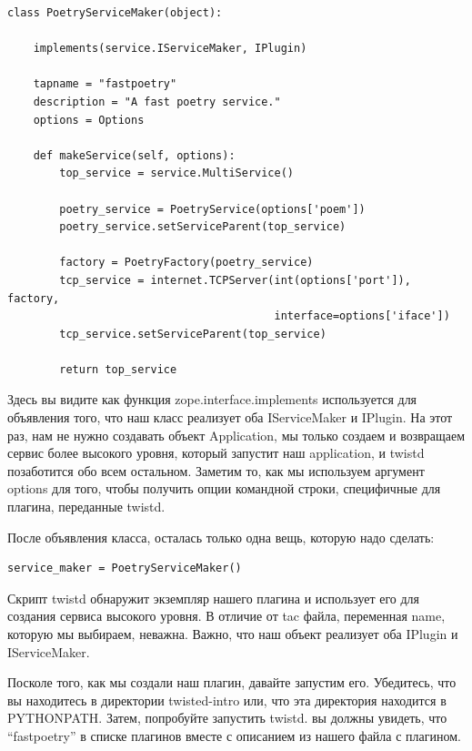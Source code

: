 \begin{scriptsize}\begin{verbatim}
class PoetryServiceMaker(object):

    implements(service.IServiceMaker, IPlugin)

    tapname = "fastpoetry"
    description = "A fast poetry service."
    options = Options

    def makeService(self, options):
        top_service = service.MultiService()

        poetry_service = PoetryService(options['poem'])
        poetry_service.setServiceParent(top_service)

        factory = PoetryFactory(poetry_service)
        tcp_service = internet.TCPServer(int(options['port']), factory,
                                         interface=options['iface'])
        tcp_service.setServiceParent(top_service)

        return top_service
\end{verbatim}\end{scriptsize}


Здесь вы видите как функция zope.interface.implements используется для 
объявления того, что наш класс реализует оба IServiceMaker и IPlugin. 
На этот раз, нам не нужно создавать объект Application, мы только 
создаем и возвращаем сервис более высокого уровня, который запустит наш 
application, и twistd позаботится обо всем остальном. Заметим то, как мы 
используем аргумент options для того, чтобы получить опции 
командной строки, специфичные для плагина, переданные twistd.


После объявления класса, осталась только одна вещь, которую надо 
сделать:

\begin{scriptsize}\begin{verbatim}
service_maker = PoetryServiceMaker()
\end{verbatim}\end{scriptsize}


Скрипт twistd обнаружит экземпляр нашего плагина и использует 
его для создания сервиса высокого уровня. В отличие от tac файла, 
переменная name, которую мы выбираем, неважна. Важно, что наш 
объект реализует оба IPlugin и IServiceMaker.  


Посколе того, как мы создали наш плагин, давайте запустим его. 
Убедитесь, что вы находитесь в директории twisted-intro или, что
эта директория находится в PYTHONPATH. Затем, попробуйте 
запустить twistd. вы должны увидеть, что ``fastpoetry'' в списке 
плагинов вместе с описанием из нашего файла с плагином.



